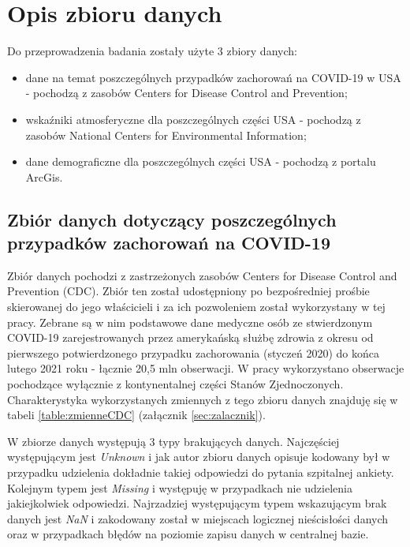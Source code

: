 \documentclass[polish, twoside, 12pt, a4paper]{article}
\theoremstyle{definition}
\theoremstyle{plain}
\theoremstyle{remark}
\begin{document}
\clearpage
\section{Opis zbioru danych}
\label{chapter:data-set}


Do przeprowadzenia badania zostały użyte 3 zbiory danych: 
\begin{itemize}[noitemsep]
  \item dane na temat poszczególnych przypadków zachorowań na COVID-19 w USA - pochodzą z zasobów Centers for Disease Control and Prevention;
  \item wskaźniki atmosferyczne dla poszczególnych części USA - pochodzą z zasobów National Centers for Environmental Information;
  \item dane demograficzne  dla poszczególnych części USA - pochodzą z portalu ArcGis.
\end{itemize}

\subsection{Zbiór danych dotyczący poszczególnych przypadków zachorowań na COVID-19}

Zbiór danych pochodzi z zastrzeżonych zasobów Centers for Disease Control and Prevention (CDC). Zbiór ten został udostępniony po bezpośredniej prośbie skierowanej do jego właścicieli i za ich pozwoleniem został wykorzystany w tej pracy. Zebrane są w nim podstawowe dane medyczne osób ze stwierdzonym COVID-19 zarejestrowanych przez amerykańską służbę zdrowia z okresu od pierwszego potwierdzonego przypadku zachorowania (styczeń 2020) do końca lutego 2021 roku - łącznie 20,5 mln obserwacji. W pracy wykorzystano obserwacje pochodzące wyłącznie z kontynentalnej części Stanów Zjednoczonych. Charakterystyka wykorzystanych zmiennych z tego zbioru danych znajduję się w tabeli \ref{table:zmienneCDC} (załącznik \ref{sec:zalacznik}).

W zbiorze danych występują 3 typy brakujących danych. Najczęściej występującym jest \emph{Unknown} i jak autor zbioru danych opisuje kodowany był w przypadku udzielenia dokładnie takiej odpowiedzi do pytania szpitalnej ankiety. Kolejnym typem jest  \emph{Missing} i występuję w przypadkach nie udzielenia jakiejkolwiek odpowiedzi. Najrzadziej występującym typem wskazującym brak danych jest \emph{NaN} i zakodowany został w miejscach logicznej nieścisłości danych oraz w przypadkach błędów na poziomie zapisu danych w centralnej bazie.
\end{document}
